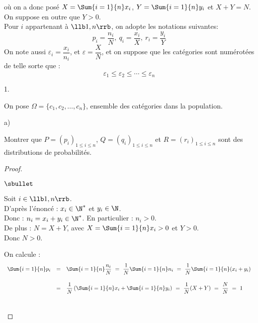 \documentclass[11pt]{article}%
\begin{document}
\noindent
où on a donc posé $X= \Sum{i=1}{n} x_i$, $Y= \Sum{i=1}{n} y_i$ et 
$X+Y=N$. On suppose en outre que $Y>0$. \\
Pour $i$ appartenant à $\llb 1,n\rrb$, on adopte les notations 
suivantes: 
\[
 p_i=\dfrac{n_i}{N}, \ q_i=\dfrac{x_i}{X},  \ r_i=\dfrac{y_i}{Y}
\]
On note aussi $\varepsilon_i= \dfrac{x_i}{n_i}$, et 
$\varepsilon=\dfrac{X}{N}$, et on suppose que les catégories sont 
numérotées de telle sorte que : 
\[
 \varepsilon_1 \leq \varepsilon_2 \leq \cdots \leq \varepsilon_n
\]

\begin{noliste}{1.}
 \setlength{\itemsep}{4mm}
 \setcounter{enumi}{9}
 \item On pose $\Omega=\{c_1,c_2, \ldots ,c_n\}$, ensemble des 
 catégories dans la population.
 \begin{noliste}{a)}
  \setlength{\itemsep}{2mm}
  \item Montrer que $P=(p_i)_{1 \leq i \leq n}$, $Q= (q_i)_{1 \leq i 
  \leq n}$ et $R= (r_i)_{1 \leq i \leq n}$ sont des distributions de 
  probabilités.
  
  \begin{proof}~
    \begin{noliste}{$\sbullet$}
      \item Soit $i\in \llb 1,n \rrb$.\\
      D'après l'énoncé : $x_i
      \in \N^*$ et $y_i \in \N$.\\
      Donc : $n_i =x_i+y_i \in \N^*$. En particulier : $n_i > 0$.\\
      De plus : $N=X+Y$, avec $X= \Sum{i=1}{n} x_i > 0$ et $Y>0$.\\
      Donc $N>0$.
      
      \item On calcule :
      \[
      \begin{array}{rcl}
        \Sum{i=1}{n} p_i & = & \Sum{i=1}{n} \dfrac{n_i}{N} \ = \ 
        \dfrac{1}{N} \Sum{i=1}{n} n_i \ = \ \dfrac{1}{N} \Sum{i=1}{n}
        (x_i+y_i) 
        \\[.6cm]
        & = & \dfrac{1}{N} \left(\Sum{i=1}{n} x_i + 
	\Sum{i=1}{n} y_i \right) \ = \
        \dfrac{1}{N}(X+Y) \ = \ \dfrac{N}{N} \ = \ 1
      \end{array}
      \]
    \end{noliste}
    ~\\[-1cm]
  \end{proof}
  

\end{noliste}
\end{noliste}
\end{document}
